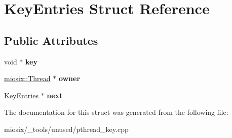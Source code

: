 \hypertarget{struct_key_entries}{\section{Key\-Entries Struct Reference}
\label{struct_key_entries}
}
\subsection*{Public Attributes}
\begin{DoxyCompactItemize}
\item 
\hypertarget{struct_key_entries_af9568d85c8827a07a91afe043ee78caf}{void $\ast$ {\bfseries key}}\label{struct_key_entries_af9568d85c8827a07a91afe043ee78caf}

\item 
\hypertarget{struct_key_entries_a81bdc4fa4d15829af89ced6c5a15749a}{\hyperlink{classmiosix_1_1_thread}{miosix\-::\-Thread} $\ast$ {\bfseries owner}}\label{struct_key_entries_a81bdc4fa4d15829af89ced6c5a15749a}

\item 
\hypertarget{struct_key_entries_af330cde4fa169f8c90ba200ea3d2ee0e}{\hyperlink{struct_key_entries}{Key\-Entries} $\ast$ {\bfseries next}}\label{struct_key_entries_af330cde4fa169f8c90ba200ea3d2ee0e}

\end{DoxyCompactItemize}


The documentation for this struct was generated from the following file\-:\begin{DoxyCompactItemize}
\item 
miosix/\-\_\-tools/unused/pthread\-\_\-key.\-cpp\end{DoxyCompactItemize}
